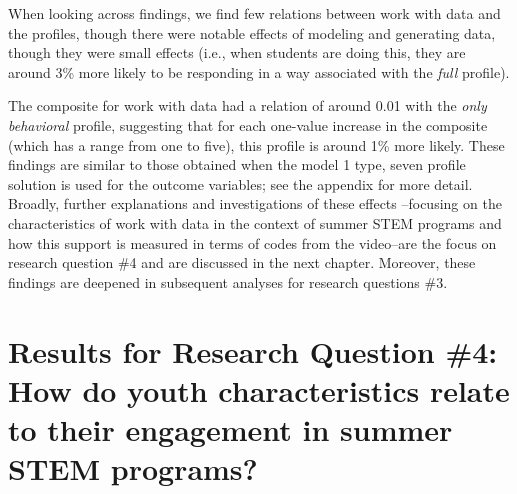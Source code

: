 \documentclass[]{msu-thesis}
\theoremstyle{definition}
\theoremstyle{definition}
\theoremstyle{definition}
\theoremstyle{remark}
\begin{document}
When looking across findings, we find few relations between work with
data and the profiles, though there were notable effects of modeling and
generating data, though they were small effects (i.e., when students are
doing this, they are around 3\% more likely to be responding in a way
associated with the \emph{full} profile).

\begin{landscape}\begin{table}

\caption{\label{tab:unnamed-chunk-13}Summary of results for research question 3}
\centering
{}
\end{table}
\end{landscape}

The composite for work with data had a relation of around 0.01 with the
\emph{only behavioral} profile, suggesting that for each one-value
increase in the composite (which has a range from one to five), this
profile is around 1\% more likely. These findings are similar to those
obtained when the model 1 type, seven profile solution is used for the
outcome variables; see the appendix for more detail. Broadly, further
explanations and investigations of these effects --focusing on the
characteristics of work with data in the context of summer STEM programs
and how this support is measured in terms of codes from the video--are
the focus on research question \#4 and are discussed in the next
chapter. Moreover, these findings are deepened in subsequent analyses
for research questions \#3.

\section{Results for Research Question \#4: How do youth characteristics
relate to their engagement in summer STEM
programs?}\label{results-for-research-question-4-how-do-youth-characteristics-relate-to-their-engagement-in-summer-stem-programs}
\end{document}
